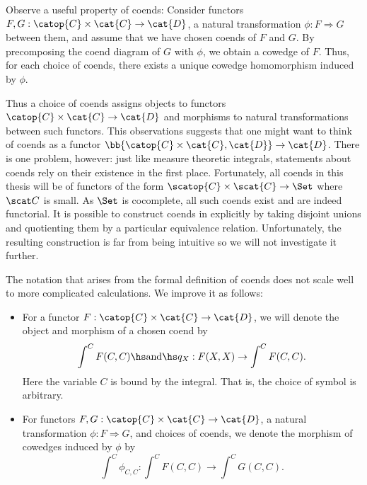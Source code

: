 Observe a useful property of coends: Consider functors
$F,G:\catop{C}\times\cat{C}\to\cat{D}$, a natural transformation
$\phi:F\Rightarrow G$ between them, and assume that we have chosen coends of $F$
and $G$. By precomposing the coend diagram of $G$ with $\phi$, we obtain a
cowedge of $F$. Thus, for each choice of coends, there exists a unique cowedge
homomorphism induced by $\phi$.

Thus a choice of coends assigns objects to functors $\catop{C}\times\cat{C}\to\cat{D}$
and morphisms to natural transformations between such functors. This
observations suggests that one might want to think of coends as a functor
$\bb{\catop{C}\times\cat{C},\cat{D}}\to\cat{D}$. There is one problem, however:
just like measure theoretic integrals, statements about coends rely on their
existence in the first place. Fortunately, all coends in this thesis will be of
functors of the form $\scatop{C}\times\scat{C}\to\Set$ where $\scat C$ is
small. As $\Set$ is cocomplete, all such coends exist and are indeed
functorial. It is possible to construct coends in \Set{} explicitly by taking
disjoint unions and quotienting them by a particular equivalence relation.
Unfortunately, the resulting construction is far from being intuitive so we
will not investigate it further.

\begin{notation}
  The notation that arises from the formal definition of coends does not scale
  well to more complicated calculations. We improve it as follows:
  \begin{itemize}
    \item For a functor $F:\catop{C}\times\cat{C}\to\cat{D}$, we will denote the
      object and morphism of a chosen coend by
      \begin{align}\label{eq:coend_integral_notation}
        \int^{C} F(C,C) \hs\text{and}\hs q_X:F(X,X)\to\int^C F(C,C).
      \end{align}
      Here the variable $C$ is bound by the integral. That is, the choice of
      symbol is arbitrary.
    \item For functors $F,G:\catop{C}\times\cat{C}\to\cat{D}$, a natural
      transformation $\phi: F\Rightarrow G$, and choices of coends, we denote
      the morphism of cowedges induced by $\phi$ by
      \begin{equation}\label{eq:coend_natural_transformation}
        \int^C \phi_{C,C} : \int^C F(C,C) \to \int^C G(C,C).
      \end{equation}
  \end{itemize}
\end{notation}

